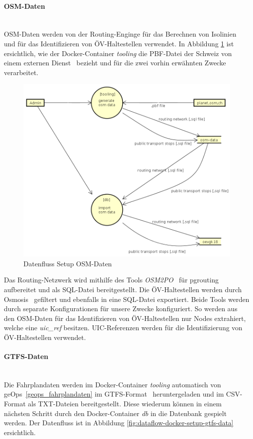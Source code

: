 \paragraph{OSM-Daten}~\\
\acs{OSM}-Daten werden von der Routing-Enginge für das Berechnen von Isolinien und für das Identifizieren von \acs{ÖV}-Haltestellen verwendet.
In Abbildung \ref{fig:dataflow-docker-setup-osm-data} ist ersichtlich, wie der Docker-Container \emph{tooling} die \acs{PBF}-Datei der Schweiz von einem externen Dienst~\cite{planet_osm_ch} bezieht und für die zwei vorhin erwähnten Zwecke verarbeitet.

\begin{figure}[ht]
    \centering
    \includegraphics[width=0.8\linewidth]{projectdoc/img/dataflow-docker-setup-osm-data.png}
    \caption[Datenfluss Setup OSM-Daten]{Datenfluss Setup OSM-Daten}
    \label{fig:dataflow-docker-setup-osm-data}
\end{figure}

Das Routing-Netzwerk wird mithilfe des Tools \emph{OSM2PO}~\cite{OSM2PO} für pgrouting aufbereitet und als SQL-Datei bereitgestellt.
Die \acs{ÖV}-Haltestellen werden durch Osmosis~\cite{osmosis} gefiltert und ebenfalls in eine SQL-Datei exportiert.
Beide Tools werden durch separate Konfigurationen für unsere Zwecke konfiguriert.
So werden aus den \acs{OSM}-Daten für das Identifizieren von \acs{ÖV}-Haltestellen nur Nodes extrahiert, welche eine \emph{uic\_ref} besitzen. \ac{UIC}-Referenzen werden für die Identifizierung von \acs{ÖV}-Haltestellen verwendet.

\paragraph{GTFS-Daten}~\\
Die Fahrplandaten werden im Docker-Container \emph{tooling} automatisch von geOps~\ref{geops_fahrplandaten} im GTFS-Format~\cite{gtfs_spec} heruntergeladen und im CSV-Format als TXT-Dateien bereitgestellt.
Diese wiederum können in einem nächsten Schritt durch den Docker-Container \emph{db} in die Datenbank gespielt werden.
Der Datenfluss ist in Abbildung \ref{fig:dataflow-docker-setup-gtfs-data} ersichtlich.

